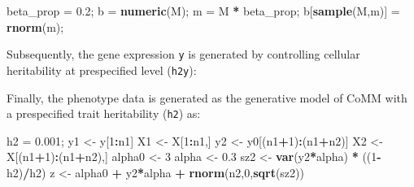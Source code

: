 \documentclass[]{article}
\newenvironment{Shaded}{\begin{snugshade}}{\end{snugshade}}
\newcommand{\KeywordTok}[1]{\textcolor[rgb]{0.13,0.29,0.53}{\textbf{#1}}}
\newcommand{\DecValTok}[1]{\textcolor[rgb]{0.00,0.00,0.81}{#1}}
\newcommand{\FloatTok}[1]{\textcolor[rgb]{0.00,0.00,0.81}{#1}}
\newcommand{\StringTok}[1]{\textcolor[rgb]{0.31,0.60,0.02}{#1}}
\newcommand{\OperatorTok}[1]{\textcolor[rgb]{0.81,0.36,0.00}{\textbf{#1}}}
\newcommand{\NormalTok}[1]{#1}
\begin{document}
\begin{Shaded}
\begin{Highlighting}[]
\NormalTok{beta_prop =}\StringTok{ }\FloatTok{0.2}\NormalTok{;}
\NormalTok{b =}\StringTok{ }\KeywordTok{numeric}\NormalTok{(M);}
\NormalTok{m =}\StringTok{ }\NormalTok{M }\OperatorTok{*}\StringTok{ }\NormalTok{beta_prop;}
\NormalTok{b[}\KeywordTok{sample}\NormalTok{(M,m)] =}\StringTok{ }\KeywordTok{rnorm}\NormalTok{(m);}
\end{Highlighting}
\end{Shaded}

Subsequently, the gene expression \texttt{y} is generated by controlling
cellular heritability at prespecified level (\texttt{h2y}):

\begin{Shaded}
\end{Shaded}

Finally, the phenotype data is generated as the generative model of CoMM
with a prespecified trait heritability (\texttt{h2}) as:

\begin{Shaded}
\begin{Highlighting}[]
\NormalTok{h2 =}\StringTok{ }\FloatTok{0.001}\NormalTok{;}
\NormalTok{y1 <-}\StringTok{ }\NormalTok{y[}\DecValTok{1}\OperatorTok{:}\NormalTok{n1]}
\NormalTok{X1 <-}\StringTok{ }\NormalTok{X[}\DecValTok{1}\OperatorTok{:}\NormalTok{n1,]}
\NormalTok{y2 <-}\StringTok{ }\NormalTok{y0[(n1}\OperatorTok{+}\DecValTok{1}\NormalTok{)}\OperatorTok{:}\NormalTok{(n1}\OperatorTok{+}\NormalTok{n2)]}
\NormalTok{X2 <-}\StringTok{ }\NormalTok{X[(n1}\OperatorTok{+}\DecValTok{1}\NormalTok{)}\OperatorTok{:}\NormalTok{(n1}\OperatorTok{+}\NormalTok{n2),]}
\NormalTok{alpha0 <-}\StringTok{ }\DecValTok{3}  
\NormalTok{alpha <-}\StringTok{ }\FloatTok{0.3}
\NormalTok{sz2 <-}\StringTok{ }\KeywordTok{var}\NormalTok{(y2}\OperatorTok{*}\NormalTok{alpha) }\OperatorTok{*}\StringTok{ }\NormalTok{((}\DecValTok{1}\OperatorTok{-}\NormalTok{h2)}\OperatorTok{/}\NormalTok{h2)}
\NormalTok{z <-}\StringTok{ }\NormalTok{alpha0 }\OperatorTok{+}\StringTok{ }\NormalTok{y2}\OperatorTok{*}\NormalTok{alpha }\OperatorTok{+}\StringTok{ }\KeywordTok{rnorm}\NormalTok{(n2,}\DecValTok{0}\NormalTok{,}\KeywordTok{sqrt}\NormalTok{(sz2))}
\end{Highlighting}
\end{Shaded}
\end{document}
